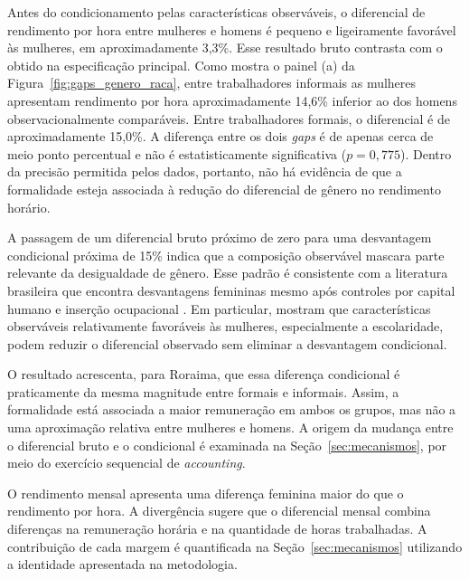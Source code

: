 \documentclass[12pt]{article}
\begin{document}
Antes do condicionamento pelas características observáveis, o diferencial de
rendimento por hora entre mulheres e homens é pequeno e ligeiramente favorável
às mulheres, em aproximadamente 3,3\%. Esse resultado bruto contrasta com o
obtido na especificação principal. Como mostra o painel (a) da
Figura~\ref{fig:gaps_genero_raca}, entre trabalhadores informais as mulheres
apresentam rendimento por hora aproximadamente 14,6\% inferior ao dos homens
observacionalmente comparáveis. Entre trabalhadores formais, o diferencial é
de aproximadamente 15,0\%. A diferença entre os dois \textit{gaps} é de apenas cerca de
meio ponto percentual e não é estatisticamente significativa ($p=0,775$).
Dentro da precisão permitida pelos dados, portanto, não há evidência de que a
formalidade esteja associada à redução do diferencial de gênero no rendimento
horário.

A passagem de um diferencial bruto próximo de zero para uma desvantagem
condicional próxima de 15\% indica que a composição observável mascara parte
relevante da desigualdade de gênero. Esse padrão é consistente com a literatura
brasileira que encontra desvantagens femininas mesmo após controles por capital
humano e inserção ocupacional \citep{giuberti2005, madalozzo2010,
morello2021}. Em particular, \citet{giuberti2005} mostram que características
observáveis relativamente favoráveis às
mulheres, especialmente a escolaridade, podem reduzir o diferencial observado
sem eliminar a desvantagem condicional.

O resultado acrescenta, para Roraima, que essa diferença condicional é
praticamente da mesma magnitude entre formais e informais. Assim, a formalidade
está associada a maior remuneração em ambos os grupos, mas não a uma aproximação
relativa entre mulheres e homens. A origem da mudança entre o diferencial bruto
e o condicional é examinada na Seção~\ref{sec:mecanismos}, por meio do exercício
sequencial de \textit{accounting}.

O rendimento mensal apresenta uma diferença feminina maior do que o rendimento
por hora. A divergência sugere que o diferencial mensal combina diferenças na
remuneração horária e na quantidade de horas trabalhadas. A contribuição de
cada margem é quantificada na Seção~\ref{sec:mecanismos} utilizando a identidade
apresentada na metodologia.

\end{document}
